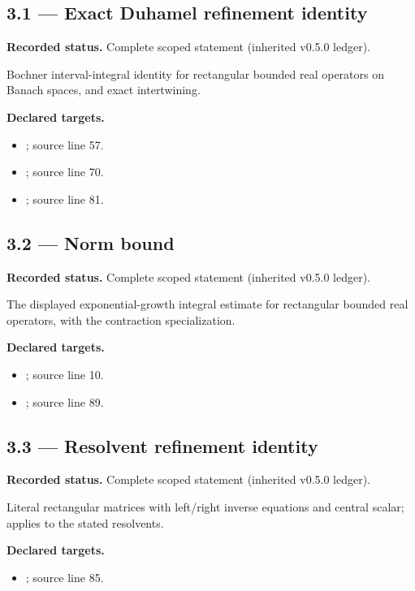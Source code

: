 \subsection{3.1 — Exact Duhamel refinement identity}
\label{result:3.1}
\textbf{Recorded status.} Complete scoped statement (inherited v0.5.0 ledger).\par
Bochner interval-integral identity for rectangular bounded real operators on Banach spaces, and exact intertwining.

\textbf{Declared targets.}\begin{itemize}
\item {}; source line 57.
\item {}; source line 70.
\item {}; source line 81.
\end{itemize}
\subsection{3.2 — Norm bound}
\label{result:3.2}
\textbf{Recorded status.} Complete scoped statement (inherited v0.5.0 ledger).\par
The displayed exponential-growth integral estimate for rectangular bounded real operators, with the contraction specialization.

\textbf{Declared targets.}\begin{itemize}
\item {}; source line 10.
\item {}; source line 89.
\end{itemize}
\subsection{3.3 — Resolvent refinement identity}
\label{result:3.3}
\textbf{Recorded status.} Complete scoped statement (inherited v0.5.0 ledger).\par
Literal rectangular matrices with left/right inverse equations and central scalar; applies to the stated resolvents.

\textbf{Declared targets.}\begin{itemize}
\item {}; source line 85.
\end{itemize}
